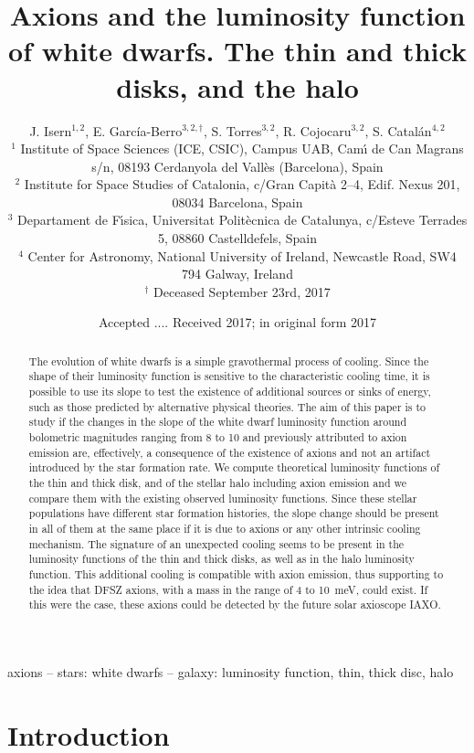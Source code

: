 \documentclass[useAMS,usenatbib]{mnras}
\title[Axions and the luminosity function of white dwarfs] {Axions and
  the luminosity function  of white dwarfs. The thin  and thick disks,
  and the halo}
\author[J. Isern  et  al.]{J. Isern$^{1,2}$,
  E. Garc\'ia-Berro$^{3,2,\dagger}$,
  S.  Torres$^{3,2}$,
  R. Cojocaru$^{3,2}$,
  S. Catal\'an$^{4,2}$\\
%
$^{1}$ Institute  of Space Sciences  (ICE, CSIC), Campus UAB,  Cam\'{\i} de
  Can  Magrans  s/n,  08193  Cerdanyola  del  Vall{\`e}s  (Barcelona),
  Spain\\
%  
  $^{2}$  Institute for  Space Studies  of Catalonia,  c/Gran Capit\`a
  2--4, Edif. Nexus 201, 08034 Barcelona, Spain\\
%
$^{3}$  Departament  de  F\'\i   sica,  Universitat  Polit\`ecnica  de
  Catalunya, c/Esteve Terrades 5, 08860 Castelldefels, Spain\\
%
$^{4}$ Center for Astronomy, National University of Ireland, Newcastle Road,
  SW4 794 Galway, Ireland\\
%
$^{\dagger}$ Deceased September 23rd, 2017}
\begin{document}
\date{Accepted .... Received 2017; in original form 2017}
\pagerange{\pageref{firstpage}--\pageref{lastpage}} 
\maketitle

\begin{abstract}
  The evolution  of white dwarfs  is a simple gravothermal  process of
  cooling.  Since the shape of  their luminosity function is sensitive
  to the characteristic cooling time, it  is possible to use its slope
  to test the existence of additional sources or sinks of energy, such
  as those predicted by alternative physical theories. The aim of this
  paper is  to study if  the changes in the  slope of the  white dwarf
  luminosity function  around bolometric magnitudes ranging  from 8 to
  10 and previously  attributed to axion emission  are, effectively, a
  consequence  of  the  existence  of   axions  and  not  an  artifact
  introduced  by  the star  formation  rate.   We compute  theoretical
  luminosity functions of the thin and  thick disk, and of the stellar
  halo including axion emission and  we compare them with the existing
  observed luminosity functions.  Since these stellar populations have
  different star  formation histories, the slope change  should be
  present in all of  them at the same place if it is  due to axions or
  any other intrinsic cooling mechanism. The signature of an unexpected
  cooling seems to be  present in the luminosity functions  of the thin
  and thick  disks, as well as  in the halo luminosity  function. This
  additional  cooling   is  compatible   with  axion   emission,  thus
  supporting to the idea that DFSZ axions, with a mass in the range of
  4 to  10~meV, could exist. If  this were the  case, these axions  could be
  detected by the future solar axioscope IAXO.
\end{abstract}

\begin{keywords}
axions --  stars: white dwarfs  -- galaxy: luminosity  function, thin,
thick disc, halo
\end{keywords}

\label{firstpage}


\section{Introduction}
\end{document}
